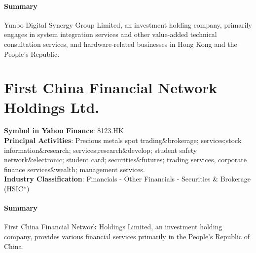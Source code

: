 \paragraph{Summary}
Yunbo Digital Synergy Group Limited, an investment holding company, primarily engages in system integration services and other value-added technical consultation services, and hardware-related businesses in Hong Kong and the People's Republic.


\section{First China Financial Network Holdings Ltd.}
\textbf{Symbol in Yahoo Finance}: 8123.HK\\
\textbf{Principal Activities}: Precious metals spot trading\&brokerage; services;stock information\&research; services;research\&develop; student safety network\&electronic; student card; securities\&futures; trading services, corporate finance services\&wealth; management services.\\
\textbf{Industry Classification}: Financials - Other Financials - Securities \& Brokerage (HSIC*)
\paragraph{Summary}
First China Financial Network Holdings Limited, an investment holding company, provides various financial services primarily in the People's Republic of China.